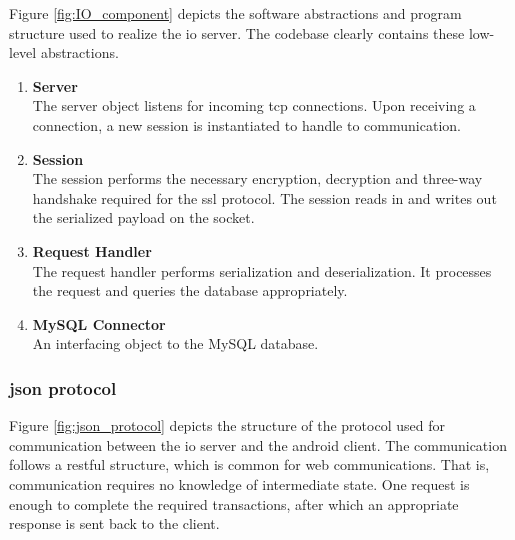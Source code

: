 Figure \ref{fig:IO_component} depicts the software abstractions and program structure used to realize the \ac{io} server.
The codebase clearly contains these low-level abstractions.
\begin{enumerate}
\item \textbf{Server}\\
The server object listens for incoming \ac{tcp} connections.
Upon receiving a connection, a new session is instantiated to handle to communication.
\item \textbf{Session}\\
The session performs the necessary encryption, decryption and three-way handshake required for the \ac{ssl} protocol.
The session reads in and writes out the serialized payload on the socket.
\item \textbf{Request Handler}\\
The request handler performs serialization and deserialization.
It processes the request and queries the database appropriately.
\item \textbf{MySQL Connector}\\
An interfacing object to the MySQL database.
\end{enumerate}

\pagebreak
\subsubsection{\ac{json} protocol}
Figure \ref{fig:json_protocol} depicts the structure of the protocol used for communication between the \ac{io} server and the android client.
The communication follows a \ac{rest}ful structure, which is common for web communications.
That is, communication requires no knowledge of intermediate state.
One request is enough to complete the required transactions, after which an appropriate response is sent back to the client.

